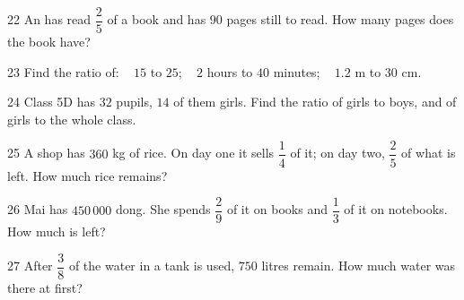 \gap
\begin{probbox}{22}{\relax}
An has read $\dfrac25$ of a book and has $90$ pages still to read. How many pages does the book have?
\end{probbox}
\gap
\begin{probbox}{23}{\relax}
Find the ratio of: \  $15$ to $25$; \  $2$ hours to $40$ minutes; \  $1.2$ m to $30$ cm.
\end{probbox}
\gap
\begin{probbox}{24}{\relax}
Class 5D has $32$ pupils, $14$ of them girls. Find the ratio of girls to boys, and of girls to the whole class.
\end{probbox}
\gap
\begin{probbox}{25}{\relax}
A shop has $360$ kg of rice. On day one it sells $\dfrac14$ of it; on day two, $\dfrac25$ of what is left. How much rice remains?
\end{probbox}
\gap
\begin{probbox}{26}{\relax}
Mai has $450\,000$ dong. She spends $\dfrac29$ of it on books and $\dfrac13$ of it on notebooks. How much is left?
\end{probbox}
\gap
\begin{probbox}{27}{\relax}
After $\dfrac38$ of the water in a tank is used, $750$ litres remain. How much water was there at first?
\end{probbox}
